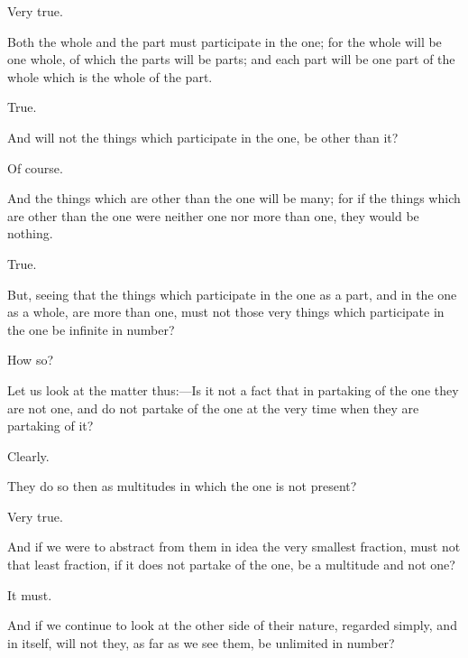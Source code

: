 \documentclass[11pt,letter]{article}
\begin{document}
\par  Very true.

\par  Both the whole and the part must participate in the one; for the whole will be one whole, of which the parts will be parts; and each part will be one part of the whole which is the whole of the part.

\par  True.

\par  And will not the things which participate in the one, be other than it?

\par  Of course.

\par  And the things which are other than the one will be many; for if the things which are other than the one were neither one nor more than one, they would be nothing.

\par  True.

\par  But, seeing that the things which participate in the one as a part, and in the one as a whole, are more than one, must not those very things which participate in the one be infinite in number?

\par  How so?

\par  Let us look at the matter thus:—Is it not a fact that in partaking of the one they are not one, and do not partake of the one at the very time when they are partaking of it?

\par  Clearly.

\par  They do so then as multitudes in which the one is not present?

\par  Very true.

\par  And if we were to abstract from them in idea the very smallest fraction, must not that least fraction, if it does not partake of the one, be a multitude and not one?

\par  It must.

\par  And if we continue to look at the other side of their nature, regarded simply, and in itself, will not they, as far as we see them, be unlimited in number?
\end{document}
